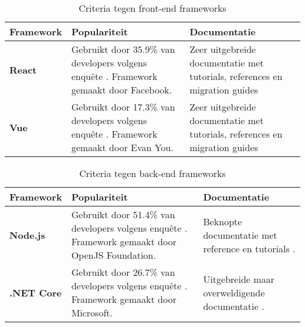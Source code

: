 \newpage

\begin{table}[hbt!]
  \centering
  \caption{Criteria tegen front-end frameworks}
  \vspace*{.5\baselineskip}
  \begin{tabular}{|p{.15\linewidth}|p{.4\linewidth}|p{.4\linewidth}|}
  \hline
  \textbf{Framework} & \textbf{Populariteit} & \textbf{Documentatie} \\ \hline
    \textbf{React} &
    Gebruikt door 35.9\% van developers volgens enquête \cite{stack-overflow-survey-2020-technology-web-frameworks}. Framework \newline gemaakt door Facebook. &
    Zeer uitgebreide documentatie met \newline tutorials, references en migration guides \cite{reactjs-docs}
    \\ \hline
    
    \textbf{Vue} &
    Gebruikt door 17.3\% van developers volgens enquête \cite{stack-overflow-survey-2020-technology-web-frameworks}. Framework \newline gemaakt door Evan You. & 
    Zeer uitgebreide documentatie met \newline tutorials, references en migration guides \cite{vue-docs}
    \\ \hline
  \end{tabular}
  \label{table:ch6-criteria-compared-against-frontend-frameworks}
\end{table}

\begin{table}[hbt!]
  \centering
  \caption{Criteria tegen back-end frameworks}
  \vspace*{.5\baselineskip}
  \begin{tabular}{|p{.15\linewidth}|p{.4\linewidth}|p{.4\linewidth}|}
  \hline
  \textbf{Framework} & \textbf{Populariteit} & \textbf{Documentatie} \\ \hline
    \textbf{Node.js} &
    Gebruikt door 51.4\% van developers volgens enquête \cite{stack-overflow-survey-2020-popular-framework-libraries-tools}. Framework \newline gemaakt door OpenJS Foundation. &
    Beknopte documentatie met reference en tutorials \cite{nodejs-docs}.
    \\ \hline

    \textbf{.NET Core} &
    Gebruikt door 26.7\% van developers volgens enquête \cite{stack-overflow-survey-2020-popular-framework-libraries-tools}. Framework \newline gemaakt door Microsoft. &
    Uitgebreide maar overweldigende \newline documentatie \cite{dotnet-core-docs}.
    \\ \hline
  \end{tabular}
  \label{table:ch6-criteria-compared-against-backend-frameworks}
\end{table}


